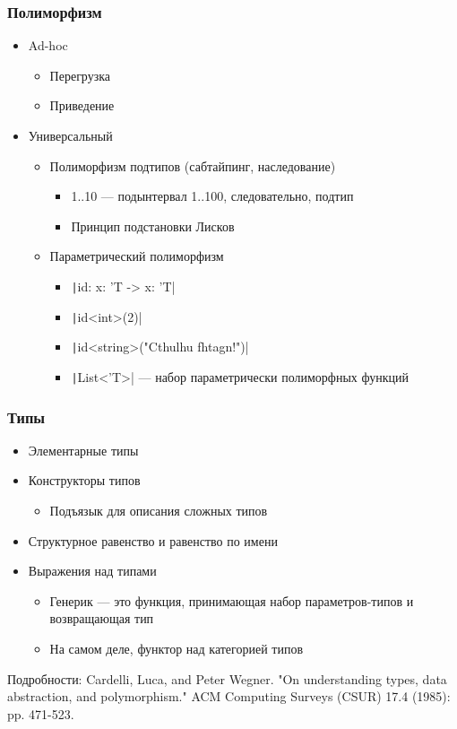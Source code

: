 \documentclass[xetex,mathserif,serif]{beamer}
\begin{document}
	\begin{frame}
		\frametitle{Полиморфизм}
		\begin{itemize}
			\item Ad-hoc
			\begin{itemize}
				\item Перегрузка
				\item Приведение
			\end{itemize}
			\item Универсальный
			\begin{itemize}
				\item Полиморфизм подтипов (сабтайпинг, наследование)
				\begin{itemize}
					\item 1..10 --- подынтервал 1..100, следовательно, подтип
					\item Принцип подстановки Лисков
				\end{itemize}
				\item Параметрический полиморфизм
				\begin{itemize}
					\item \texttt|id: x: 'T -> x: 'T|
					\item \texttt|id<int>(2)|
					\item \texttt|id<string>("Cthulhu fhtagn!")|
					\item \texttt|List<'T>| --- набор параметрически полиморфных функций
				\end{itemize}
			\end{itemize}
		\end{itemize}
	\end{frame}

	\begin{frame}
		\frametitle{Типы}
		\begin{itemize}
			\item Элементарные типы
			\item Конструкторы типов
			\begin{itemize}
				\item Подъязык для описания сложных типов
			\end{itemize}
			\item Структурное равенство и равенство по имени
			\item Выражения над типами
			\begin{itemize}
				\item Генерик --- это функция, принимающая набор параметров-типов и возвращающая тип
				\item На самом деле, функтор над категорией типов
			\end{itemize}
		\end{itemize}

		Подробности: Cardelli, Luca, and Peter Wegner. "On understanding types, data abstraction, and polymorphism." ACM Computing Surveys (CSUR) 17.4 (1985): pp. 471-523.
	\end{frame}
\end{document}
